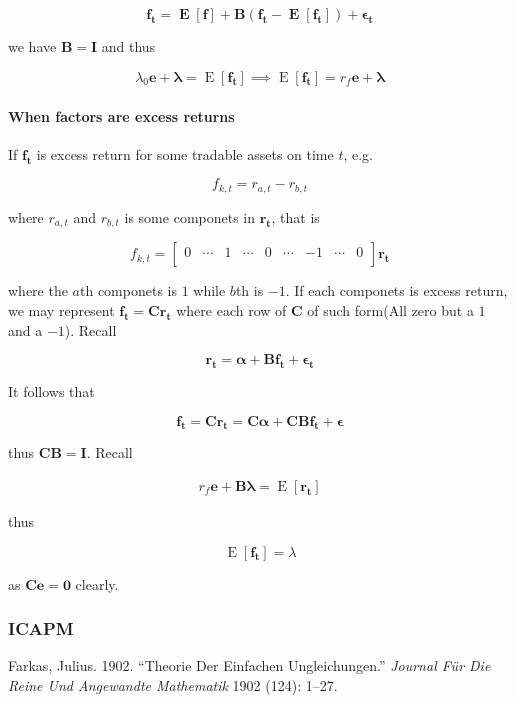 \documentclass{article}
\newlength{\cslhangindent}
\newenvironment{cslreferences}%
  {\setlength{\parindent}{0pt}%
  \everypar{\setlength{\hangindent}{\cslhangindent}}\ignorespaces}%
  {\par}
\begin{document}
\[\bm{\mathbf{f_t=\mathop{\text{E}}[f]+B(f_t-\mathop{\text{E}}[f_t])+\epsilon_t}} \]

we have \(\bm{\mathbf{B=I}}\) and thus

\[ \lambda_0 \bm{\mathbf{e}}+\bm{\mathbf{\lambda}}=\mathop{\text{E}}[\bm{\mathbf{f_t}}]\implies \mathop{\text{E}}[\bm{\mathbf{f_t}}]=\bm{\mathbf{\mathit{r_f}e+\lambda }}  \]

\hypertarget{when-factors-are-excess-returns}{%
\paragraph{When factors are excess
returns}\label{when-factors-are-excess-returns}}

If \(\bm{\mathbf{f_t}}\) is excess return for some tradable assets on
time \(t\), e.g.~

\[ f_{k,t}=r_{a,t}-r_{b,t} \]

where \(r_{a,t}\) and \(r_{b,t}\) is some componets in
\(\bm{\mathbf{r_t}}\), that is

\[ f_{k,t}=\begin{bmatrix}
  0&\cdots&1&\cdots&0&\cdots&-1&\cdots&0\\
\end{bmatrix}\bm{\mathbf{r_t}} \]

where the \(a\)th componets is \(1\) while \(b\)th is \(-1\). If each
componets is excess return, we may represent \(\bm{\mathbf{f_t=Cr_t}}\)
where each row of \(\bm{\mathbf{C}}\) of such form(All zero but a \(1\)
and a \(-1\)). Recall

\[ \bm{\mathbf{r_t=\alpha+Bf_t+\epsilon_t}} \]

It follows that

\[ \bm{\mathbf{f_t=Cr_t=C\alpha+CBf_t+\epsilon}} \]

thus \(\bm{\mathbf{CB=I}}\). Recall

\[ \begin{aligned}
  r_f \bm{\mathbf{e}}+\bm{\mathbf{B\lambda}}=\mathop{\text{E}}[\bm{\mathbf{r_t}}]
\end{aligned} \]

thus

\[ \mathop{\text{E}}[\bm{\mathbf{f_t}}]=\lambda \]

as \(\bm{\mathbf{Ce=0}}\) clearly.

\hypertarget{icapm}{%
\subsubsection{ICAPM}\label{icapm}}

\hypertarget{refs}{}
\begin{cslreferences}
\leavevmode\hypertarget{ref-farkas1902theorie}{}%
Farkas, Julius. 1902. ``Theorie Der Einfachen Ungleichungen.''
\emph{Journal Für Die Reine Und Angewandte Mathematik} 1902 (124):
1--27.
\end{cslreferences}



\end{document}
